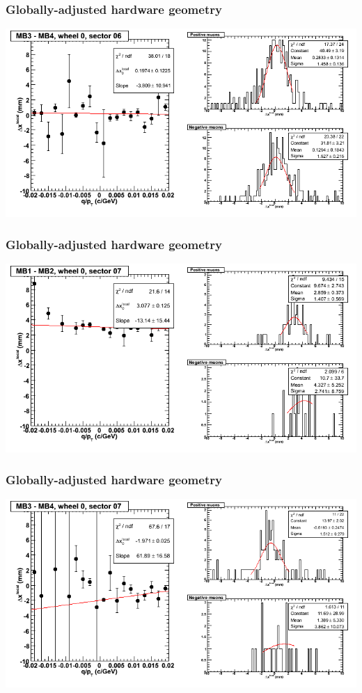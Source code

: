 \documentclass[compress]{beamer}
\begin{document}
\begin{frame}
\frametitle{Globally-adjusted hardware geometry}
\includegraphics[width=\linewidth]{NOV4_segdiffs_HW/dt13_resid_C_06_34.png}
\end{frame}

\begin{frame}
\frametitle{Globally-adjusted hardware geometry}
\includegraphics[width=\linewidth]{NOV4_segdiffs_HW/dt13_resid_C_07_12.png}
\end{frame}

\begin{frame}
\frametitle{Globally-adjusted hardware geometry}
\includegraphics[width=\linewidth]{NOV4_segdiffs_HW/dt13_resid_C_07_34.png}
\end{frame}
\end{document}

